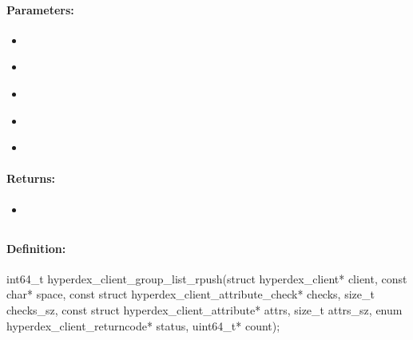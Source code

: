 \paragraph{Parameters:}
\begin{itemize}[noitemsep]
\item {}\\

\item {}\\

\item {}\\

\item {}\\

\item {}\\

\end{itemize}

\paragraph{Returns:}
\begin{itemize}[noitemsep]
\item {}\\

\end{itemize}

\pagebreak
\subsection{}
\label{api:c:group_list_rpush}


\paragraph{Definition:}
\begin{ccode}
int64_t hyperdex_client_group_list_rpush(struct hyperdex_client* client,
        const char* space,
        const struct hyperdex_client_attribute_check* checks, size_t checks_sz,
        const struct hyperdex_client_attribute* attrs, size_t attrs_sz,
        enum hyperdex_client_returncode* status,
        uint64_t* count);
\end{ccode}

